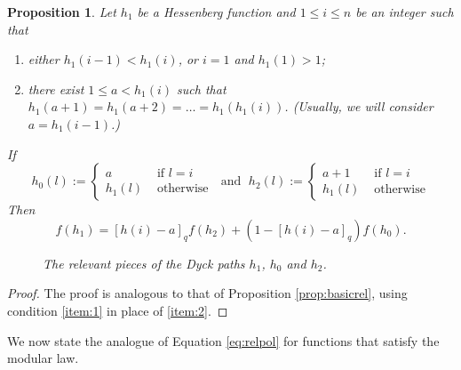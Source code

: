\documentclass[10pt]{amsart}
\newtheorem{Prop}[Lem]{Proposition}
\theoremstyle{definition}
\newcommand{\dyckpath}[2]{
\draw[line width=2pt] (#1) foreach \dir in {#2}{ -- ++(\dir*90:1)};
}
\begin{document}
\begin{Prop}
\label{prop:basicreldual}
Let $h_1$ be a Hessenberg function and $1\leq i\leq n$ be an integer such that
\begin{enumerate}
    \item either $h_1(i-1)<h_1(i)$, or $i=1$ and $h_1(1)>1$;
    \item there exist $1\leq a<h_1(i)$ such that $h_1(a+1)=h_1(a+2)=\ldots=h_1(h_1(i))$. (Usually, we will consider $a=h_1(i-1)$.)
\end{enumerate}
If
\[
h_0(l):=\begin{cases}
a &\text{ if }l=i\\
h_1(l)& \text{ otherwise}
\end{cases}
\;\text{ and }\;
h_2(l):=\begin{cases}
a+1 &\text{ if }l=i\\
h_1(l)& \text{ otherwise}
\end{cases}
\]
Then
\[
f(h_1)=[h(i)-a]_qf(h_2)+(1-[h(i)-a]_q)f(h_0).
\]
\begin{figure}[htb]  \centering
{}
\caption{The relevant pieces of the Dyck paths $h_1$, $h_0$ and $h_2$.}
\label{fig:h0h2s}
\end{figure}
\end{Prop}
\begin{proof}
The proof is analogous to that of Proposition \ref{prop:basicrel}, using condition \eqref{item:1} in place of \eqref{item:2}.
\end{proof}


We now state the analogue of Equation \eqref{eq:relpol} for functions that satisfy the modular law.
\end{document}
